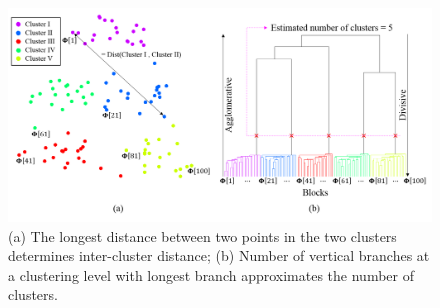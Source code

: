 \begin{figure}[!b]
\centering
\includegraphics[width=1\textwidth,keepaspectratio]{images/NumberOfClusters_Estimation.png} %
\centering
\caption{(a) The longest distance between two points in the two clusters determines inter-cluster distance; (b) Number of vertical branches at a clustering level with longest branch approximates the number of clusters.}
\label{fig:NumberOfClusters_Estimation}
\end{figure}